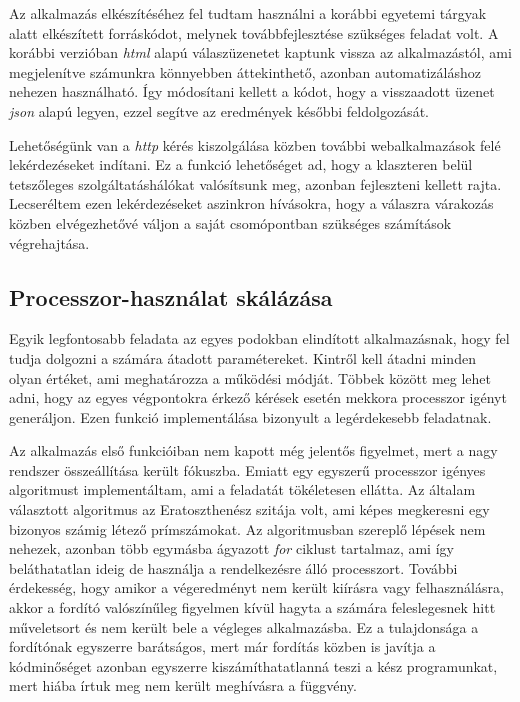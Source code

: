 Az alkalmazás elkészítéséhez fel tudtam használni a korábbi egyetemi tárgyak alatt elkészített forráskódot, melynek továbbfejlesztése szükséges feladat volt.
A korábbi verzióban \textit{html} alapú válaszüzenetet kaptunk vissza az alkalmazástól, ami megjelenítve számunkra könnyebben áttekinthető, azonban automatizáláshoz nehezen használható.
Így módosítani kellett a kódot, hogy a visszaadott üzenet \textit{json} alapú legyen, ezzel segítve az eredmények későbbi feldolgozását.

Lehetőségünk van a \textit{http} kérés kiszolgálása közben további webalkalmazások felé lekérdezéseket indítani.
Ez a funkció lehetőséget ad, hogy a klaszteren belül tetszőleges szolgáltatáshálókat valósítsunk meg, azonban fejleszteni kellett rajta.
Lecseréltem ezen lekérdezéseket aszinkron hívásokra, hogy a válaszra várakozás közben elvégezhetővé váljon a saját csomópontban szükséges számítások végrehajtása. 

\subsection{Processzor-használat skálázása}
Egyik legfontosabb feladata az egyes podokban elindított alkalmazásnak, hogy fel tudja dolgozni a számára átadott paramétereket.
Kintről kell átadni minden olyan értéket, ami meghatározza a működési módját.
Többek között meg lehet adni, hogy az egyes végpontokra érkező kérések esetén mekkora processzor igényt generáljon.
Ezen funkció implementálása bizonyult a legérdekesebb feladatnak.

Az alkalmazás első funkcióiban nem kapott még jelentős figyelmet, mert a nagy rendszer összeállítása került fókuszba.
Emiatt egy egyszerű processzor igényes algoritmust implementáltam, ami a feladatát tökéletesen ellátta.
Az általam választott algoritmus az Eratoszthenész szitája volt, ami képes megkeresni egy bizonyos számig létező prímszámokat.
Az algoritmusban szereplő lépések nem nehezek, azonban több egymásba ágyazott \textit{for} ciklust tartalmaz, ami így beláthatatlan ideig de használja a rendelkezésre álló processzort.
További érdekesség, hogy amikor a végeredményt nem került kiírásra vagy felhasználásra, akkor a fordító valószínűleg figyelmen kívül hagyta a számára feleslegesnek hitt műveletsort és nem került bele a végleges alkalmazásba.
Ez a tulajdonsága a fordítónak egyszerre barátságos, mert már fordítás közben is javítja a kódminőséget azonban egyszerre kiszámíthatatlanná teszi a kész programunkat, mert hiába írtuk meg nem került meghívásra a függvény.

